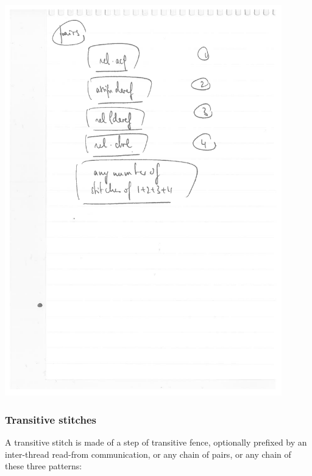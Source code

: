 \documentclass[a4paper]{article}
\begin{document}
\includegraphics[width=12cm]{pairs-stitch}

\pagebreak

\subsubsection{Transitive stitches}

A transitive stitch is made of a step of transitive fence, optionally prefixed
by an inter-thread read-from communication, or any chain of pairs, or any chain
of these three patterns:
\end{document}
